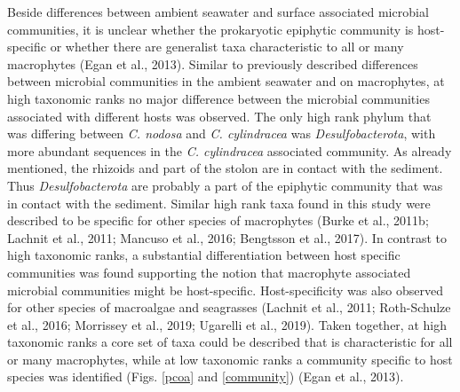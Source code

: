 \documentclass[
  12pt,
]{article}
\begin{document}
Beside differences between ambient seawater and surface associated
microbial communities, it is unclear whether the prokaryotic epiphytic
community is host-specific or whether there are generalist taxa
characteristic to all or many macrophytes (Egan et al., 2013). Similar
to previously described differences between microbial communities in the
ambient seawater and on macrophytes, at high taxonomic ranks no major
difference between the microbial communities associated with different
hosts was observed. The only high rank phylum that was differing between
\emph{C. nodosa} and \emph{C. cylindracea} was \emph{Desulfobacterota},
with more abundant sequences in the \emph{C. cylindracea} associated
community. As already mentioned, the rhizoids and part of the stolon are
in contact with the sediment. Thus \emph{Desulfobacterota} are probably
a part of the epiphytic community that was in contact with the sediment.
Similar high rank taxa found in this study were described to be specific
for other species of macrophytes (Burke et al., 2011b; Lachnit et al.,
2011; Mancuso et al., 2016; Bengtsson et al., 2017). In contrast to high
taxonomic ranks, a substantial differentiation between host specific
communities was found supporting the notion that macrophyte associated
microbial communities might be host-specific. Host-specificity was also
observed for other species of macroalgae and seagrasses (Lachnit et al.,
2011; Roth-Schulze et al., 2016; Morrissey et al., 2019; Ugarelli et
al., 2019). Taken together, at high taxonomic ranks a core set of taxa
could be described that is characteristic for all or many macrophytes,
while at low taxonomic ranks a community specific to host species was
identified (Figs. \ref{pcoa} and \ref{community}) (Egan et al., 2013).
\end{document}

